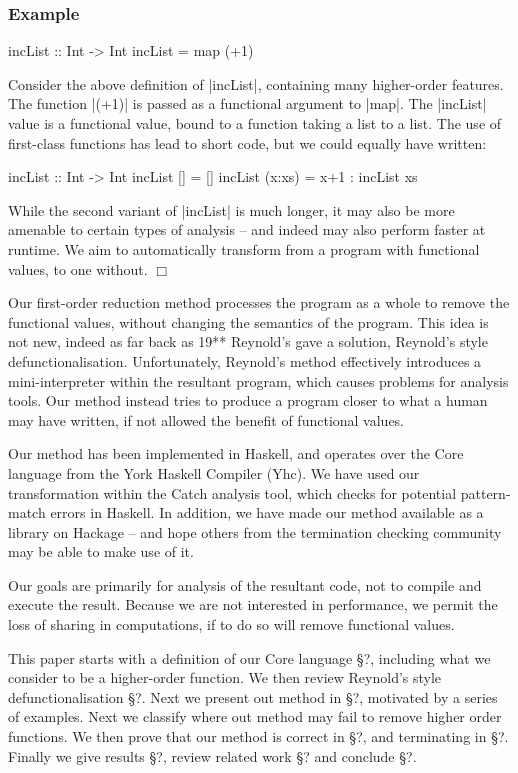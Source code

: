 \documentclass[preprint]{sigplanconf}
\newcounter{exmp}
\newenvironment{exampleany}[1]
    {\subsubsection*{Example #1}}
    {\hfill$\Box$}
\newenvironment{example}
    {\refstepcounter{exmp}
     \begin{exampleany}{\arabic{exmp}}}
    {\end{exampleany}}
\begin{document}
\begin{example}
\begin{code}
incList :: Int -> Int
incList = map (+1)
\end{code}

Consider the above definition of |incList|, containing many higher-order features. The function |(+1)| is passed as a functional argument to |map|. The |incList| value is a functional value, bound to a function taking a list to a list. The use of first-class functions has lead to short code, but we could equally have written:

\begin{code}
incList :: Int -> Int
incList []      = []
incList (x:xs)  = x+1 : incList xs
\end{code}

While the second variant of |incList| is much longer, it may also be more amenable to certain types of analysis -- and indeed may also perform faster at runtime. We aim to automatically transform from a program with functional values, to one without.
\end{example}

Our first-order reduction method processes the program as a whole to remove the functional values, without changing the semantics of the program. This idea is not new, indeed as far back as 19** Reynold's gave a solution, Reynold's style defunctionalisation. Unfortunately, Reynold's method effectively introduces a mini-interpreter within the resultant program, which causes problems for analysis tools. Our method instead tries to produce a program closer to what a human may have written, if not allowed the benefit of functional values.

Our method has been implemented in Haskell, and operates over the Core language from the York Haskell Compiler (Yhc). We have used our transformation within the Catch analysis tool, which checks for potential pattern-match errors in Haskell. In addition, we have made our method available as a library on Hackage -- and hope others from the termination checking community may be able to make use of it.

Our goals are primarily for analysis of the resultant code, not to compile and execute the result. Because we are not interested in performance, we permit the loss of sharing in computations, if to do so will remove functional values.

This paper starts with a definition of our Core language \S?, including what we consider to be a higher-order function. We then review Reynold's style defunctionalisation \S?. Next we present out method in \S?, motivated by a series of examples. Next we classify where out method may fail to remove higher order functions. We then prove that our method is correct in \S?, and terminating in \S?. Finally we give results \S?, review related work \S? and conclude \S?.
\end{document}
